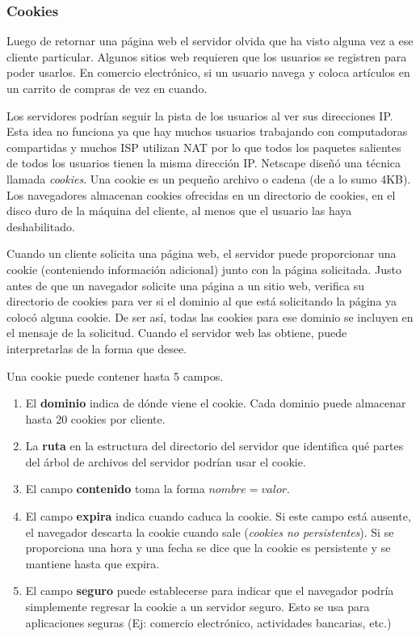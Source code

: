 \documentclass[10pt,a4paper]{report}
\begin{document}
			\subsubsection{Cookies}
				
				\par Luego de retornar una página web el servidor olvida que ha visto alguna vez a ese cliente particular. Algunos sitios web requieren que los usuarios se registren para poder usarlos. En comercio electrónico, si un usuario navega y coloca artículos en un carrito de compras de vez en cuando.
				
				\par Los servidores podrían seguir la pista de los usuarios al ver sus direcciones IP. Esta idea no funciona ya que hay muchos usuarios trabajando con computadoras compartidas y muchos ISP utilizan NAT por lo que todos los paquetes salientes de todos los usuarios tienen la misma dirección IP. Netscape diseñó una técnica llamada \textit{cookies}. Una cookie es un pequeño archivo o cadena (de a lo sumo 4KB). Los navegadores almacenan cookies ofrecidas en un directorio de cookies, en el disco duro de la máquina del cliente, al menos que el usuario las haya deshabilitado.

				\par Cuando un cliente solicita una página web, el servidor puede proporcionar una cookie (conteniendo información adicional) junto con la página solicitada. Justo antes de que un navegador solicite una página a un sitio web, verifica su directorio de cookies para ver si el dominio al que está solicitando la página ya colocó alguna cookie. De ser así, todas las cookies para ese dominio se incluyen en el mensaje de la solicitud. Cuando el servidor web las obtiene, puede interpretarlas de la forma que desee.

				\par Una cookie puede contener hasta 5 campos.
				
				\begin{enumerate}
						\item El \textbf{dominio} indica de dónde viene el cookie. Cada dominio puede almacenar hasta 20 cookies por cliente.
						\item La \textbf{ruta} en la estructura del directorio del servidor que identifica qué partes del árbol de archivos del servidor podrían usar el cookie.
						\item El campo \textbf{contenido} toma la forma $nombre = valor$.
						\item El campo \textbf{expira} indica cuando caduca la cookie. Si este campo está ausente, el navegador descarta la cookie cuando sale (\textit{cookies no persistentes}). Si se proporciona una hora y una fecha se dice que la cookie es persistente y se mantiene hasta que expira.
						\item El campo \textbf{seguro} puede establecerse para indicar que el navegador podría simplemente regresar la cookie a un servidor seguro. Esto se usa para aplicaciones seguras (Ej: comercio electrónico, actividades bancarias, etc.) 
				\end{enumerate}
\end{document}
